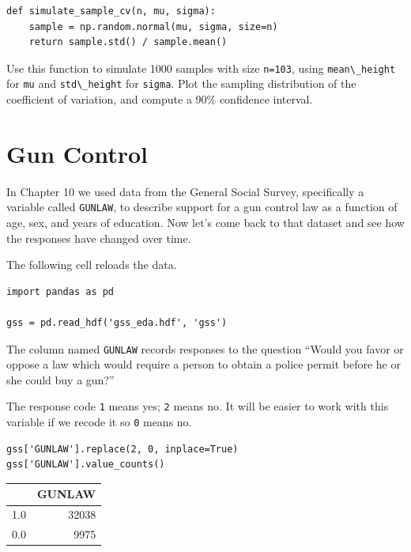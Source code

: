 \begin{lstlisting}[]
def simulate_sample_cv(n, mu, sigma):
    sample = np.random.normal(mu, sigma, size=n)
    return sample.std() / sample.mean()
\end{lstlisting}

Use this function to simulate 1000 samples with size
\passthrough{\lstinline!n=103!}, using
\passthrough{\lstinline!mean\_height!} for \passthrough{\lstinline!mu!}
and \passthrough{\lstinline!std\_height!} for
\passthrough{\lstinline!sigma!}. Plot the sampling distribution of the
coefficient of variation, and compute a 90\% confidence interval.

\hypertarget{gun-control}{%
\section{Gun Control}\label{gun-control}}

In Chapter 10 we used data from the General Social Survey, specifically
a variable called \passthrough{\lstinline!GUNLAW!}, to describe support
for a gun control law as a function of age, sex, and years of education.
Now let's come back to that dataset and see how the responses have
changed over time.

The following cell reloads the data.

\begin{lstlisting}[]
import pandas as pd

gss = pd.read_hdf('gss_eda.hdf', 'gss')
\end{lstlisting}

The column named \passthrough{\lstinline!GUNLAW!} records responses to
the question ``Would you favor or oppose a law which would require a
person to obtain a police permit before he or she could buy a gun?''

The response code \passthrough{\lstinline!1!} means yes;
\passthrough{\lstinline!2!} means no. It will be easier to work with
this variable if we recode it so \passthrough{\lstinline!0!} means no.

\begin{lstlisting}[]
gss['GUNLAW'].replace(2, 0, inplace=True)
gss['GUNLAW'].value_counts()
\end{lstlisting}

\begin{tabular}{lr}
\midrule
{} &  GUNLAW \\
\midrule
1.0 &   32038 \\
0.0 &    9975 \\
\midrule
\end{tabular}

